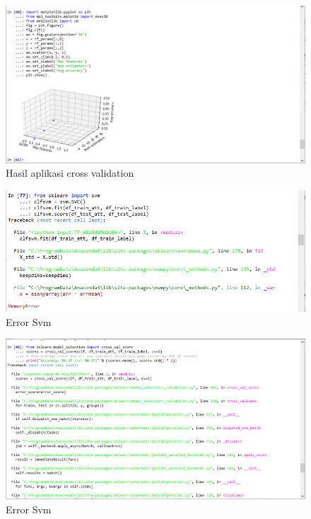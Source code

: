 \begin{figure}
      \centerline{\includegraphics[width=1\textwidth]
      {figures/cokro/c48}}
      \caption{Hasil aplikasi cross validation}
      \label{c48}
      \end{figure}

\begin{figure}
      \centerline{\includegraphics[width=1\textwidth]
      {figures/cokro/c49}}
      \caption{Error Svm}
      \label{c49}
      \end{figure}

\begin{figure}
      \centerline{\includegraphics[width=1\textwidth]
      {figures/cokro/c50}}
      \caption{Error Svm}
      \label{c50}
      \end{figure}

